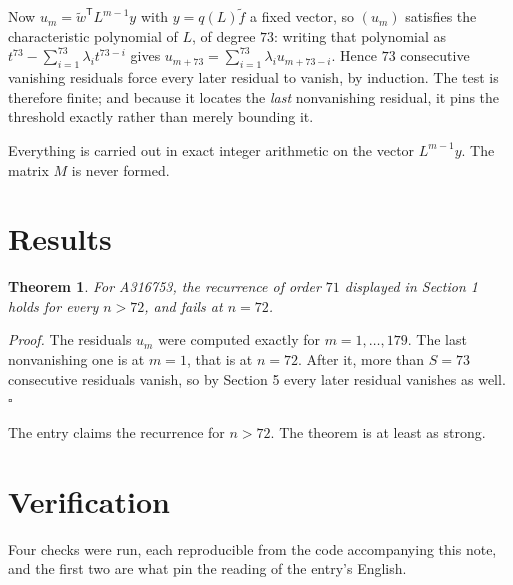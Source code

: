 \documentclass[11pt]{article}
\newtheorem{theorem}{Theorem}
\theoremstyle{definition}
\begin{document}
Now $u_m = \tilde w^{\mathsf T} L^{m-1} y$ with $y = q(L)\tilde f$ a fixed vector, so $(u_m)$ satisfies the characteristic polynomial of $L$, of degree $73$: writing that polynomial as $t^{73} - \sum_{i=1}^{73} \lambda_i t^{73-i}$ gives $u_{m+73} = \sum_{i=1}^{73} \lambda_i u_{m+73-i}$. Hence $73$ consecutive vanishing residuals force every later residual to vanish, by induction. The test is therefore finite; and because it locates the {\itshape last} nonvanishing residual, it pins the threshold exactly rather than merely bounding it.

Everything is carried out in exact integer arithmetic on the vector $L^{m-1}y$. The matrix $M$ is never formed.

\section{Results}

\begin{theorem} For A316753, the recurrence of order $71$ displayed in Section 1 holds for every $n > 72$, and fails at $n = 72$.\end{theorem}

{\itshape Proof.} The residuals $u_m$ were computed exactly for $m = 1,\dots,179$. The last nonvanishing one is at $m = 1$, that is at $n = 72$. After it, more than $S = 73$ consecutive residuals vanish, so by Section 5 every later residual vanishes as well. $\square$

The entry claims the recurrence for $n > 72$. The theorem is at least as strong.

\section{Verification}

Four checks were run, each reproducible from the code accompanying this note, and the first two are what pin the reading of the entry's English.
\end{document}
